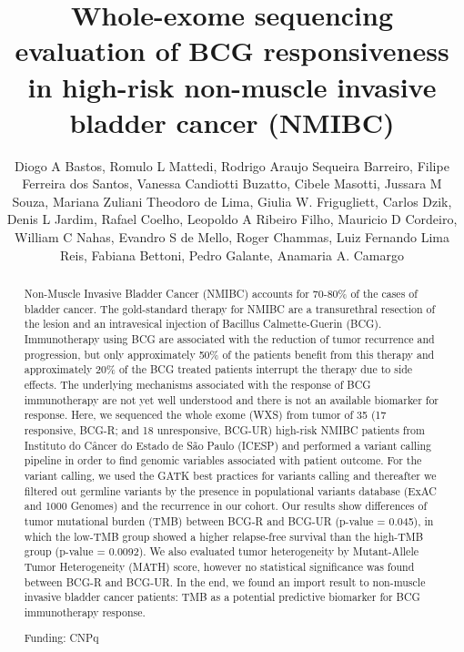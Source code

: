 \documentclass[twoside]{article}
\title{\vspace{-15mm}\fontsize{24pt}{10pt}\selectfont\textbf{ Whole-exome sequencing evaluation of BCG responsiveness in high-risk non-muscle invasive bladder cancer (NMIBC) }} %
\author{ Diogo A Bastos, Romulo L Mattedi, Rodrigo Araujo Sequeira Barreiro, Filipe Ferreira dos Santos, Vanessa Candiotti Buzatto, Cibele Masotti, Jussara M Souza, Mariana Zuliani Theodoro de Lima, Giulia W. Frigugliett, Carlos Dzik, Denis L Jardim, Rafael Coelho, Leopoldo A Ribeiro Filho, Mauricio D Cordeiro, William C Nahas, Evandro S de Mello, Roger Chammas, Luiz Fernando Lima Reis, Fabiana Bettoni, Pedro Galante, Anamaria A. Camargo }
\affil{ Translacional Oncology Center,  ICESP }
\date{}
\begin{document}
  
  
  \maketitle %
  
  
  \thispagestyle{fancy} %
  
  
  \begin{abstract}
  Non-Muscle Invasive Bladder Cancer (NMIBC) accounts for 70-80\% of the cases of bladder cancer. The gold-standard therapy for NMIBC are a transurethral resection of the lesion and an intravesical injection of Bacillus Calmette-Guerin (BCG). Immunotherapy using BCG are associated with the reduction of tumor recurrence and progression,  but only approximately 50\% of the patients benefit from this therapy and approximately 20\% of the BCG treated patients interrupt the therapy due to side effects. The underlying mechanisms associated with the response of BCG immunotherapy are not yet well understood and there is not an available biomarker for response. Here,  we sequenced the whole exome (WXS) from tumor of 35 (17 responsive,  BCG-R; and 18 unresponsive,  BCG-UR) high-risk NMIBC patients from Instituto do C\^ancer do Estado de S\~ao Paulo (ICESP) and performed a variant calling pipeline in order to find genomic variables associated with patient outcome. For the variant calling,  we used the GATK best practices for variants calling and thereafter we filtered out germline variants by the presence in populational variants database (ExAC and 1000 Genomes) and the recurrence in our cohort.  Our results show differences of tumor mutational burden (TMB) between BCG-R and BCG-UR (p-value = 0.045),  in which the low-TMB group showed a higher relapse-free survival than the high-TMB group (p-value = 0.0092). We also evaluated tumor heterogeneity by Mutant-Allele Tumor Heterogeneity (MATH) score,  however no statistical significance was found between BCG-R and BCG-UR. In the end,  we found an import result to non-muscle invasive bladder cancer patients: TMB as a potential predictive biomarker for BCG immunotherapy response.
  
  Funding: CNPq \\ 
  \end{abstract}
  
\end{document}
